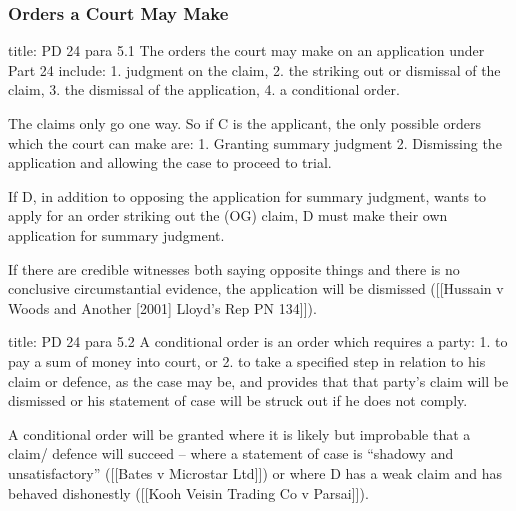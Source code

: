 \documentclass[
]{article}
\newenvironment{Shaded}{}{}
\newcommand{\NormalTok}[1]{#1}
\begin{document}
\hypertarget{orders-a-court-may-make}{%
\subsubsection{Orders a Court May Make}\label{orders-a-court-may-make}}

\begin{Shaded}
\begin{Highlighting}[]
\NormalTok{title: PD 24 para 5.1}
\NormalTok{The orders the court may make on an application under Part 24 include:}
\NormalTok{1. judgment on the claim,}
\NormalTok{2. the striking out or dismissal of the claim,}
\NormalTok{3. the dismissal of the application,}
\NormalTok{4. a conditional order.}
\end{Highlighting}
\end{Shaded}

\begin{Shaded}
\begin{Highlighting}[]
\NormalTok{The claims only go one way. So if C is the applicant, the only possible orders which the court can make are:}
\NormalTok{1. Granting summary judgment}
\NormalTok{2. Dismissing the application and allowing the case to proceed to trial.}

\NormalTok{If D, in addition to opposing the application for summary judgment, wants to apply for an order striking out the (OG) claim, D must make their own application for summary judgment. }
\end{Highlighting}
\end{Shaded}

If there are credible witnesses both saying opposite things and there is
no conclusive circumstantial evidence, the application will be dismissed
({[}{[}Hussain v Woods and Another {[}2001{]} Lloyd's Rep PN 134{]}{]}).

\begin{Shaded}
\begin{Highlighting}[]
\NormalTok{title: PD 24 para 5.2}
\NormalTok{A conditional order is an order which requires a party:}
\NormalTok{1. to pay a sum of money into court, or}
\NormalTok{2. to take a specified step in relation to his claim or defence, as the case may be, and provides that that party’s claim will be dismissed or his statement of case will be struck out if he does not comply.}
\end{Highlighting}
\end{Shaded}

A conditional order will be granted where it is likely but improbable
that a claim/ defence will succeed -- where a statement of case is
``shadowy and unsatisfactory'' ({[}{[}Bates v Microstar Ltd{]}{]}) or
where D has a weak claim and has behaved dishonestly ({[}{[}Kooh Veisin
Trading Co v Parsai{]}{]}).
\end{document}
